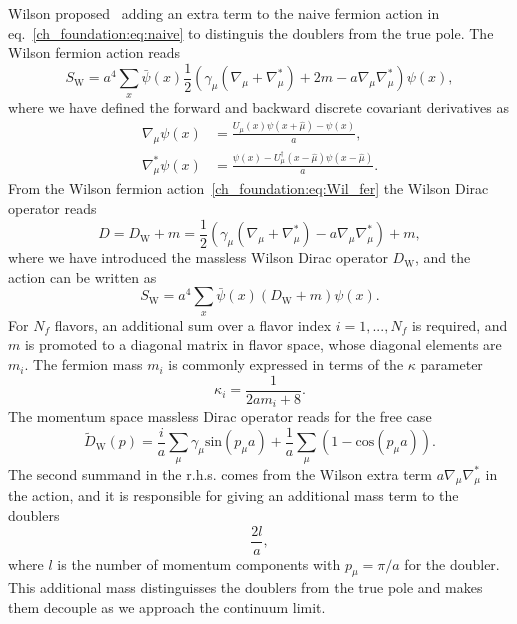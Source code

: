 Wilson proposed~\citep{Wilson:1974sk} adding an extra term to the naive fermion action in eq.~\eqref{ch_foundation:eq:naive} to distinguis the doublers from the true pole. The Wilson fermion action reads
\begin{equation}
\label{ch_foundation:eq:Wil_fer}
S_{\textrm{W}}=a^4\sum_x\bar{\psi}(x)\frac{1}{2}\left(\gamma_{\mu}\left(\nabla_{\mu}+\nabla_{\mu}^*\right)+2m-a\nabla_{\mu}\nabla_{\mu}^*\right)\psi(x),
\end{equation}
where we have defined the forward and backward discrete covariant derivatives as
\begin{align}
\nabla_{\mu}\psi(x)&=\frac{U_{\mu}(x)\psi(x+\hat{\mu})-\psi(x)}{a},\\
\nabla_{\mu}^*\psi(x)&=\frac{\psi(x)-U_{\mu}^{\dagger}(x-\hat{\mu})\psi(x-\hat{\mu})}{a}.
\end{align}
From the Wilson fermion action~\eqref{ch_foundation:eq:Wil_fer} the Wilson Dirac operator reads
\begin{equation}
\label{ch_foundation:eq:DW}
D=D_{\textrm{W}}+m=\frac{1}{2}\left(\gamma_{\mu}\left(\nabla_{\mu}+\nabla_{\mu}^*\right)-a\nabla_{\mu}\nabla_{\mu}^*\right)+m,
\end{equation}
where we have introduced the massless Wilson Dirac operator $D_{\textrm{W}}$, and the action can be written as
\begin{equation}
S_{\textrm{W}}=a^4\sum_x\bar{\psi}(x)\left(D_{\textrm{W}}+m\right)\psi(x).
\end{equation}
For $N_f$ flavors, an additional sum over a flavor index $i=1,...,N_f$ is required, and $m$ is promoted to a diagonal matrix in flavor space, whose diagonal elements are $m_i$. The fermion mass $m_i$ is commonly expressed in terms of the $\kappa$ parameter
\begin{equation}
\label{ch_foundation:eq:kappa}
\kappa_i=\frac{1}{2am_i+8}.
\end{equation}
The momentum space massless Dirac operator reads for the free case
\begin{equation}
\tilde{D}_{\textrm{W}}(p)=\frac{i}{a}\sum_{\mu}\gamma_{\mu}\textrm{sin}(p_{\mu}a)+\frac{1}{a}\sum_{\mu}\left(1-\textrm{cos}(p_{\mu}a)\right).
\end{equation}
The second summand in the r.h.s. comes from the Wilson extra term $a\nabla_{\mu}\nabla_{\mu}^*$ in the action, and it is responsible for giving an additional mass term to the doublers
\begin{equation}
\frac{2l}{a},
\end{equation}
where $l$ is the number of momentum components with $p_{\mu}=\pi/a$ for the doubler. This additional mass distinguisses the doublers from the true pole and makes them decouple as we approach the continuum limit.

